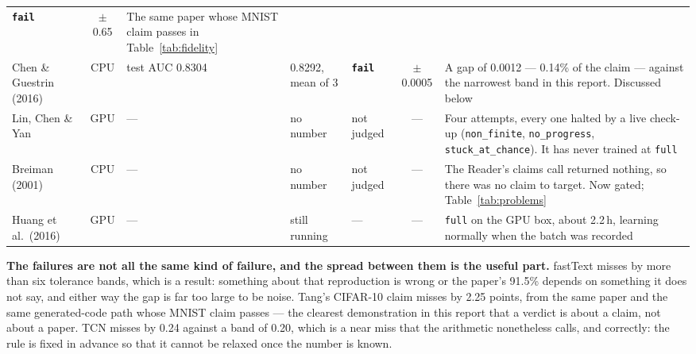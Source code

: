 \documentclass[10pt,twocolumn]{article}
\begin{document}
\begin{table}[tbp]
\begin{tabular}{L{0.175\textwidth}cL{0.115\textwidth}L{0.13\textwidth}L{0.075\textwidth}cL{0.235\textwidth}}
  \textbf{\texttt{fail}} & $\pm$0.65 & The same paper whose MNIST claim passes in
  Table~\ref{tab:fidelity} \\
Chen \& Guestrin (2016) \cite{chen2016xgboost} & CPU & test AUC 0.8304 & 0.8292, mean of 3 &
  \textbf{\texttt{fail}} & $\pm$0.0005 & A gap of 0.0012 --- 0.14\% of the claim --- against the
  narrowest band in this report. Discussed below \\
\midrule
Lin, Chen \& Yan \cite{lin2014nin} & GPU & --- & no number & not judged & --- & Four attempts,
  every one halted by a live check-up (\texttt{non\_finite}, \texttt{no\_progress},
  \texttt{stuck\_at\_chance}). It has never trained at \texttt{full} \\
Breiman (2001) \cite{breiman2001rf} & CPU & --- & no number & not judged & --- & The Reader's
  claims call returned nothing, so there was no claim to target. Now gated;
  Table~\ref{tab:problems} \\
Huang et al.\ (2016) \cite{huang2016stochastic} & GPU & --- & still running & --- & --- &
  \texttt{full} on the GPU box, about 2.2\,h, learning normally when the batch was recorded \\
\bottomrule
\end{tabular}
\end{table}

\textbf{The failures are not all the same kind of failure, and the spread between them is the
useful part.} fastText misses by more than six tolerance bands, which is a result: something
about that reproduction is wrong or the paper's 91.5\% depends on something it does not say, and
either way the gap is far too large to be noise. Tang's CIFAR-10 claim misses by 2.25 points,
from the same paper and the same generated-code path whose MNIST claim passes --- the clearest
demonstration in this report that a verdict is about a claim, not about a paper. TCN misses by
0.24 against a band of 0.20, which is a near miss that the arithmetic nonetheless calls, and
correctly: the rule is fixed in advance so that it cannot be relaxed once the number is known.
\end{document}
